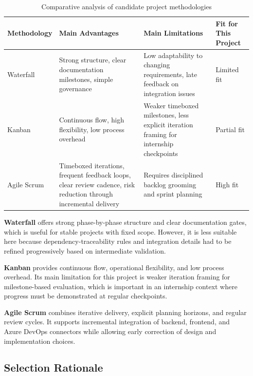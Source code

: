 \begin{table}[H]
  \centering
  \caption{Comparative analysis of candidate project methodologies}
  \label{tab:methodology-comparison}
  \setlength{\tabcolsep}{4pt}
  \renewcommand{\arraystretch}{1.15}
  \begin{tabularx}{\linewidth}{|>{\raggedright\arraybackslash}p{2.9cm}|>{\raggedright\arraybackslash}X|>{\raggedright\arraybackslash}X|>{\raggedright\arraybackslash}p{3.0cm}|}
    \hline
    \textbf{Methodology} & \textbf{Main Advantages} & \textbf{Main Limitations} & \textbf{Fit for This Project} \\
    \hline
    Waterfall & Strong structure, clear documentation milestones, simple governance & Low adaptability to changing requirements, late feedback on integration issues & Limited fit \\
    \hline
    Kanban & Continuous flow, high flexibility, low process overhead & Weaker timeboxed milestones, less explicit iteration framing for internship checkpoints & Partial fit \\
    \hline
    Agile Scrum & Timeboxed iterations, frequent feedback loops, clear review cadence, risk reduction through incremental delivery & Requires disciplined backlog grooming and sprint planning & High fit \\
    \hline
  \end{tabularx}
  \setlength{\tabcolsep}{6pt}
  \renewcommand{\arraystretch}{1.5}
\end{table}

\textbf{Waterfall} offers strong phase-by-phase structure and clear
documentation gates, which is useful for stable projects with fixed scope.
However, it is less suitable here because dependency-traceability rules and
integration details had to be refined progressively based on intermediate
validation.

\textbf{Kanban} provides continuous flow, operational flexibility, and low
process overhead. Its main limitation for this project is weaker iteration
framing for milestone-based evaluation, which is important in an internship
context where progress must be demonstrated at regular checkpoints.

\textbf{Agile Scrum} combines iterative delivery, explicit planning horizons,
and regular review cycles. It supports incremental integration of backend,
frontend, and Azure DevOps connectors while allowing early correction of design
and implementation choices.

\subsection{Selection Rationale}
\label{subsec:impl-methodology-rationale}

